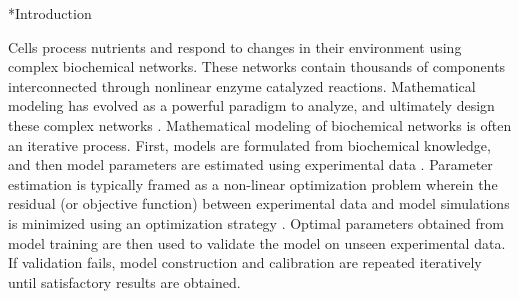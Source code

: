 \documentclass[12pt]{article}
\makeatletter
\renewcommand\section{\@startsection
	{subsection}{2}{0mm}
	{-0.2in}
	{0.05\baselineskip}
	{\normalfont\large\bfseries}}
\makeatother
\begin{document}

\pagebreak

\setcounter{page}{1}

\linenumbers


\section*{Introduction}

Cells process nutrients and respond to changes in their environment using complex biochemical networks. These networks contain thousands of components
interconnected through nonlinear enzyme catalyzed reactions. Mathematical modeling has evolved as a powerful paradigm to analyze, and ultimately design these complex networks \cite{assmus2006dynamics, Riel:2006aa,Jaqaman:2006aa,kitano2002systems,hood2004systems}. Mathematical modeling of biochemical networks is often an iterative process.
First, models are formulated from biochemical knowledge, and then model parameters are estimated using experimental data \cite{Aldridge:2006aa,banga2008optimization,ashyraliyev2009systems}.
Parameter estimation is typically framed as a non-linear optimization problem wherein the residual (or objective function) between experimental data and model simulations is minimized using an optimization strategy \cite{moles2003parameter}. Optimal parameters obtained from model training are then used to validate the model on unseen experimental data.
If validation fails, model construction and calibration are repeated iteratively until satisfactory results are obtained.
\end{document}
